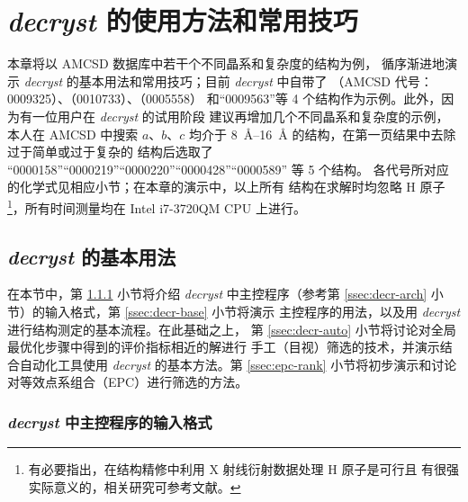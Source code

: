 
\chapter{\emph{decryst} 的使用方法和常用技巧}\label{chap:decr-usage}

本章将以 AMCSD 数据库\parencite{downs2003}中若干个不同晶系和复杂度的结构为例，
循序渐进地演示 \emph{decryst} 的基本用法和常用技巧；目前 \emph{decryst} 中自带了
（AMCSD 代号：0009325）、（0010733）、（0005558）
和“0009563”等 4 个结构作为示例。此外，因为有一位用户在 \emph{decryst} 的试用阶段
建议再增加几个不同晶系和复杂度的示例，本人在 AMCSD 中搜索 $a$、$b$、$c$ 均介于
\SIrange{8}{16}{\angstrom} 的结构，在第一页结果中去除过于简单或过于复杂的
结构后选取了 “0000158”“0000219”“0000220”“0000428”“0000589” 等 5 个结构。
各代号所对应的化学式见相应小节；在本章的演示中，以上所有
结构在求解时均忽略 H 原子\footnote{%
	有必要指出，在结构精修中利用 X 射线衍射数据处理 H 原子是可行且
	有很强实际意义的，相关研究可参考文献\parencite{cooper2010}。%
}，所有时间测量均在 Intel i7-3720QM CPU 上进行。

\section{\emph{decryst} 的基本用法}

在本节中，第 \ref{ssec:decr-fmt} 小节将介绍 \emph{decryst} 中主控程序（参考第
\ref{ssec:decr-arch} 小节）的输入格式，第 \ref{ssec:decr-base} 小节将演示
主控程序的用法，以及用 \emph{decryst} 进行结构测定的基本流程。在此基础之上，
第 \ref{ssec:decr-auto} 小节将讨论对全局最优化步骤中得到的评价指标相近的解进行
手工（目视）筛选的技术，并演示结合自动化工具使用 \emph{decryst} 的基本方法。第
\ref{ssec:epc-rank} 小节将初步演示和讨论对等效点系组合（EPC）进行筛选的方法。

\subsection{\emph{decryst} 中主控程序的输入格式}\label{ssec:decr-fmt}

